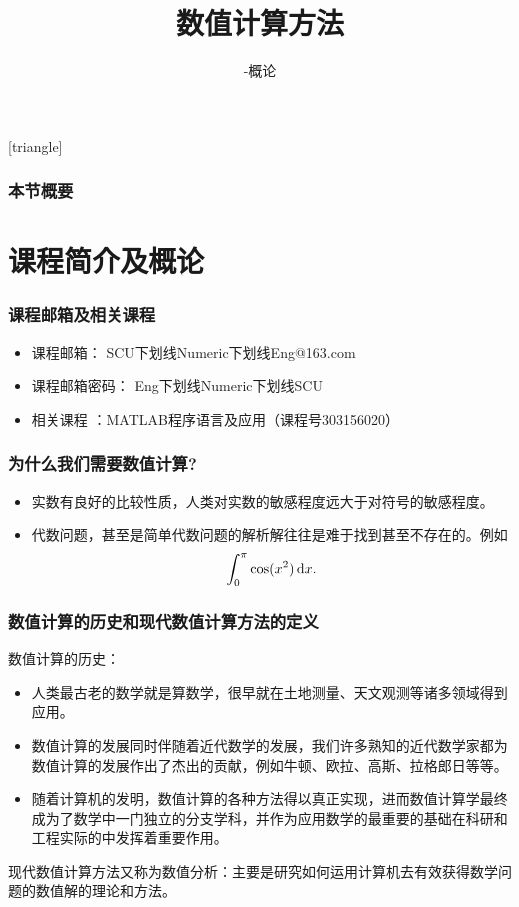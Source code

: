 \documentclass[10pt]{beamer}
\title[数值计算方法]{数值计算方法}
\subtitle{-概论}
\def\dx{\,{\rm d}x}
\begin{document}
[triangle]

\begin{frame}
\titlepage
\end{frame}


\begin{frame}
  \frametitle{本节概要}
  \tableofcontents%
\end{frame}

\section{课程简介及概论}

\begin{frame}
\frametitle{课程邮箱及相关课程}
\begin{itemize}
\item 课程邮箱： SCU下划线Numeric下划线Eng@163.com
\item 课程邮箱密码： Eng下划线Numeric下划线SCU
\item 相关课程 ：MATLAB程序语言及应用（课程号303156020）
\end{itemize}

\end{frame}

\begin{frame}
\frametitle{为什么我们需要数值计算?}
\begin{itemize}
\item 实数有良好的比较性质，人类对实数的敏感程度远大于对符号的敏感程度。
\item 代数问题，甚至是简单代数问题的解析解往往是难于找到甚至不存在的。例如
\begin{equation}
\int_0^{\pi} \cos(x^2) \dx.
\end{equation}
\end{itemize}

\end{frame}

\begin{frame}
\frametitle{数值计算的历史和现代数值计算方法的定义}
数值计算的历史：
\begin{itemize}
\item 人类最古老的数学就是算数学，很早就在土地测量、天文观测等诸多领域得到应用。
\item 数值计算的发展同时伴随着近代数学的发展，我们许多熟知的近代数学家都为数值计算的发展作出了杰出的贡献，例如牛顿、欧拉、高斯、拉格郎日等等。
\item 随着计算机的发明，数值计算的各种方法得以真正实现，进而数值计算学最终成为了数学中一门独立的分支学科，并作为应用数学的最重要的基础在科研和工程实际的中发挥着重要作用。
\end{itemize}

现代数值计算方法又称为数值分析：主要是研究如何运用计算机去有效获得数学问题的数值解的理论和方法。

\end{frame}
\end{document}
